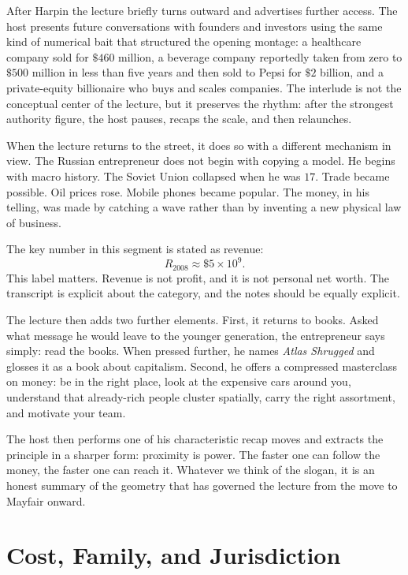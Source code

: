 After Harpin the lecture briefly turns outward and advertises further access. The host presents future conversations with founders and investors using the same kind of numerical bait that structured the opening montage: a healthcare company sold for \(\$460\) million, a beverage company reportedly taken from zero to \(\$500\) million in less than five years and then sold to Pepsi for \(\$2\) billion, and a private-equity billionaire who buys and scales companies. The interlude is not the conceptual center of the lecture, but it preserves the rhythm: after the strongest authority figure, the host pauses, recaps the scale, and then relaunches.

When the lecture returns to the street, it does so with a different mechanism in view. The Russian entrepreneur does not begin with copying a model. He begins with macro history. The Soviet Union collapsed when he was \(17\). Trade became possible. Oil prices rose. Mobile phones became popular. The money, in his telling, was made by catching a wave rather than by inventing a new physical law of business.

The key number in this segment is stated as revenue:
\begin{equation}
R_{2008} \approx \$5\times 10^9.
\end{equation}
This label matters. Revenue is not profit, and it is not personal net worth. The transcript is explicit about the category, and the notes should be equally explicit.

The lecture then adds two further elements. First, it returns to books. Asked what message he would leave to the younger generation, the entrepreneur says simply: read the books. When pressed further, he names \emph{Atlas Shrugged} and glosses it as a book about capitalism. Second, he offers a compressed masterclass on money: be in the right place, look at the expensive cars around you, understand that already-rich people cluster spatially, carry the right assortment, and motivate your team.

The host then performs one of his characteristic recap moves and extracts the principle in a sharper form: proximity is power. The faster one can follow the money, the faster one can reach it. Whatever we think of the slogan, it is an honest summary of the geometry that has governed the lecture from the move to Mayfair onward.

\section{Cost, Family, and Jurisdiction}

